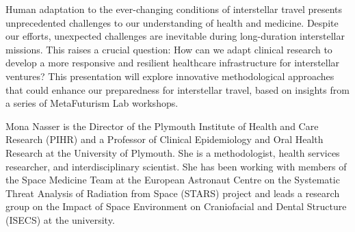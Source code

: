 \documentclass[a4paper,parskip,10pt]{scrartcl}
\begin{document}
    \begin{tcolorbox}[
        enhanced,
        title={Keynote Lecture 5: Mona Nasser (University of Plymouth) \\  Voyaging Through the Vast \textemdash~Transforming Clinical Research Methods for Interstellar Expeditions},
        sharp corners,
        colbacktitle=thistrack,
        fonttitle=\large\mediumfont,
        boxsep=0pt,
        boxrule=0pt,
        left*=0pt,
        lefttitle=4mm,
        toptitle=4mm,
        bottomtitle=4mm,
        top=0pt,
        bottom=0pt,
        sidebyside,
        sidebyside align=center,
        lefthand width=6cm,
        segmentation empty,
    ]%
        
        \tcblower

        \setlength{\parskip}{1ex}
        
        \vspace{1ex}
        Human adaptation to the ever-changing conditions of interstellar travel presents unprecedented challenges to our understanding of health and medicine. Despite our efforts, unexpected challenges are inevitable during long-duration interstellar missions. This raises a crucial question: How can we adapt clinical research to develop a more responsive and resilient healthcare infrastructure for interstellar ventures? This presentation will explore innovative methodological approaches that could enhance our preparedness for interstellar travel, based on insights from a series of MetaFuturism Lab workshops.

        {
            \small
            \color{white!20!black}
            Mona Nasser is the Director of the Plymouth Institute of Health and Care Research (PIHR) and a Professor of Clinical Epidemiology and Oral Health Research at the University of Plymouth. She is a methodologist, health services researcher, and interdisciplinary scientist. She has been working with members of the Space Medicine Team at the European Astronaut Centre on the Systematic Threat Analysis of Radiation from Space (STARS) project and leads a research group on the Impact of Space Environment on Craniofacial and Dental Structure (ISECS) at the university.}

        \vspace{2ex}
    \end{tcolorbox}
\end{document}
